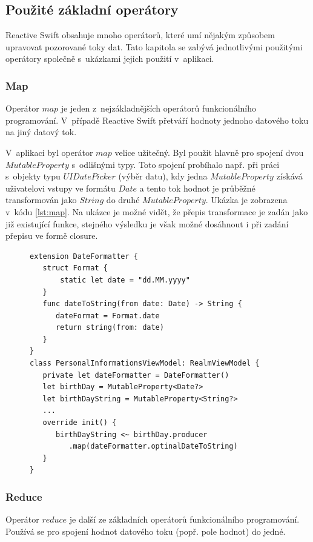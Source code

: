 \documentclass[thesis=M,czech]{FITthesis}[2012/06/26]
\begin{document}
\subsection{Použité základní operátory}
Reactive Swift obsahuje mnoho operátorů, které umí nějakým způsobem upravovat pozorované toky dat. Tato kapitola se zabývá jednotlivými použitými operátory společně s~ukázkami jejich použití v~aplikaci.

\subsubsection{Map}
Operátor $map$ je jeden z~nejzákladnějších operátorů funkcionálního programování. V~případě Reactive Swift přetváří hodnoty jednoho datového toku na jiný datový tok. \cite{operators}

V~aplikaci byl operátor $map$ velice užitečný. Byl použit hlavně pro spojení dvou $MutableProperty$ s~odlišnými typy. Toto spojení probíhalo např. při práci s~objekty typu $UIDatePicker$ (výběr datu), kdy jedna $MutableProperty$ získává uživatelovi vstupy ve formátu $Date$ a tento tok hodnot je průběžné transformován jako $String$ do druhé $MutableProperty$. Ukázka je zobrazena v~kódu \ref{lst:map}. Na ukázce je možné vidět, že přepis transformace je zadán jako již existující funkce, stejného výsledku je však možné dosáhnout i při zadání přepisu ve formě closure.

\begin{figure}
\begin{minipage}{\linewidth}
\begin{lstlisting}[caption={Ukázka použití Map},label={lst:map}]
extension DateFormatter {
   struct Format {
       static let date = "dd.MM.yyyy"
   }
   func dateToString(from date: Date) -> String {
      dateFormat = Format.date
      return string(from: date)
   }
}
class PersonalInformationsViewModel: RealmViewModel {
   private let dateFormatter = DateFormatter()
   let birthDay = MutableProperty<Date?>
   let birthDayString = MutableProperty<String?>
   ...
   override init() {
      birthDayString <~ birthDay.producer
         .map(dateFormatter.optinalDateToString)
   }
}
\end{lstlisting}
\end{minipage}
\end{figure}	

\subsubsection{Reduce}
Operátor $reduce$ je další ze základních operátorů funkcionálního programování. Používá se pro spojení hodnot datového toku (popř. pole hodnot) do jedné. \cite{operators}
\end{document}
